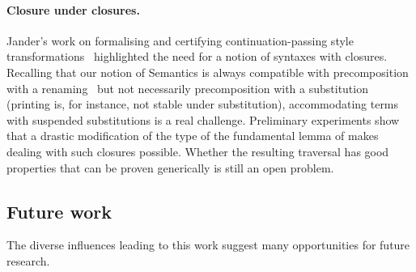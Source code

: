 {\paragraph{Closure under closures.} Jander's work on formalising and certifying
continuation-passing style transformations~\cite{Jander:Thesis:2019}
highlighted the need for a notion of syntaxes with closures. Recalling
that our notion of Semantics is always compatible with precomposition
with a renaming~\cite{Kaiser-wsdebr} but not necessarily
precomposition with a substitution (printing is, for instance, not
stable under substitution), accommodating terms with suspended
substitutions is a real challenge. Preliminary experiments show that a
drastic modification of the type of the fundamental lemma of
 makes dealing with such closures possible. Whether the
resulting traversal has good properties that can be proven generically
is still an open problem.

\subsection{Future work}

The diverse influences leading to this work suggest many opportunities for
future research.

}
